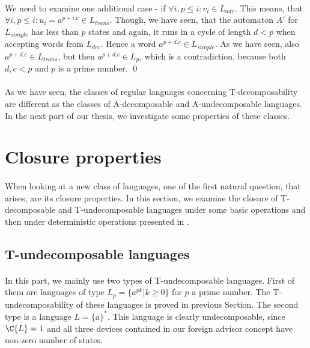 \paragraph{}
We need to examine one additional case - if $\forall i, p \leq i: v_i \in L_{adv}$. This means, that $\forall i, p\leq i: u_i = a^{p+i.c} \in L_{trans}$. Though, we have seen, that the automaton $A'$ for $L_{simple}$ has less than $p$ states and again, it runs in a cycle of length $d < p$ when accepting words from $L_{dec}$. Hence a word $a^{p+d.c} \in L_{simple}$. As we have seen, also $a^{p+d.c} \in L_{trans}$, but then $a^{p+d.c} \in L_p$, which is a contradiction, because both $d,c<p$ and $p$ is a prime number. \qed

\paragraph{}
As we have seen, the classes of regular languages concerning T-decomposability are different as the classes of A-decomposable and A-undecomposable languages. In the next part of our thesis, we investigate some properties of these classes.

\section{Closure properties}

\paragraph{}
When looking at a new class of languages, one of the first natural question, that arises, are its closure properties.  In this section, we examine the closure of T-decomposable and T-undecomposable languages under some basic operations and then under deterministic operations presented in \cite{AFDL}.

\subsection{T-undecomposable languages}
\paragraph{}
In this part, we mainly use two types of T-undecomposable languages. First of them are languages of type $L_p = \{ a^{pk} | k \geq 0 \}$ for $p$ a prime number. The T-undecomposability of these languages is proved in previous Section. The second type is a language $L = \{ a \}^*$. This language is clearly undecomposable, since $\C{L} = 1$ and all three devices contained in our foreign advisor concept have non-zero number of states.

